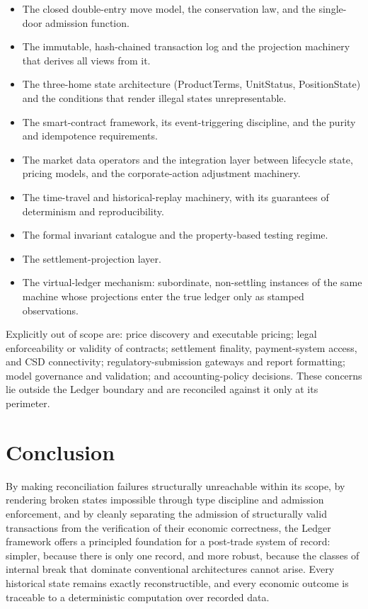 \documentclass[11pt,a4paper]{article}
\newcommand{\clabel}[1]{\leavevmode\hypertarget{clause-#1}{}%
  \marginpar{\raggedright\scriptsize\ttfamily\textcolor{gray}{#1}}}
\providecommand{\tightlist}{\setlength{\itemsep}{2pt}\setlength{\parskip}{0pt}}
\begin{document}
\begin{itemize}
\tightlist
\item
  \clabel{C-Scope.2}The closed double-entry move model, the conservation law, and the
  single-door admission function.
\item
  \clabel{C-Scope.3}The immutable, hash-chained transaction log and the projection
  machinery that derives all views from it.
\item
  \clabel{C-Scope.4}The three-home state architecture (ProductTerms, UnitStatus,
  PositionState) and the conditions that render illegal states
  unrepresentable.
\item
  \clabel{C-Scope.5}The smart-contract framework, its event-triggering discipline, and the
  purity and idempotence requirements.
\item
  \clabel{C-Scope.6}The market data operators and the integration layer between lifecycle
  state, pricing models, and the corporate-action adjustment machinery.
\item
  \clabel{C-Scope.7}The time-travel and historical-replay machinery, with its guarantees
  of determinism and reproducibility.
\item
  \clabel{C-Scope.8}The formal invariant catalogue and the property-based testing regime.
\item
  \clabel{C-Scope.9}The settlement-projection layer.
\item
  \clabel{C-Scope.10}The virtual-ledger mechanism: subordinate, non-settling instances of
  the same machine whose projections enter the true ledger only as
  stamped observations.
\end{itemize}

\clabel{C-Scope.11}Explicitly out of scope are: price discovery and executable pricing;
legal enforceability or validity of contracts; settlement finality,
payment-system access, and CSD connectivity; regulatory-submission
gateways and report formatting; model governance and validation; and
accounting-policy decisions. These concerns lie outside the Ledger
boundary and are reconciled against it only at its perimeter.

\hypertarget{conclusion}{%
\section{Conclusion}\label{conclusion}}

By making reconciliation failures structurally unreachable within its
scope, by rendering broken states impossible through type discipline and
admission enforcement, and by cleanly separating the admission of
structurally valid transactions from the verification of their economic
correctness, the Ledger framework offers a principled foundation for a
post-trade system of record: simpler, because there is only one record,
and more robust, because the classes of internal break that dominate
conventional architectures cannot arise. Every historical state remains
exactly reconstructible, and every economic outcome is traceable to a
deterministic computation over recorded data.
\end{document}
